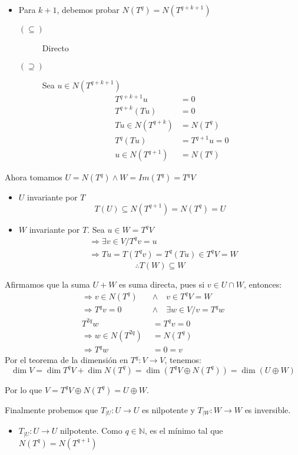 \documentclass[10pt,a4paper]{article}
\begin{document}
\begin{itemize}
\begin{itemize}
			\item Para $k+1$, debemos probar $N\left(T^{q}\right) = N\left(T^{q+k+1}\right)$
				\begin{description}
					\item[$(\subseteq)$] Directo
					\item[$(\supseteq)$] Sea $u\in N\left(T^{q+k+1}\right)$
						\begin{align*}
							T^{q+k+1}u &= 0\\
							T^{q+k}(Tu) &= 0\\
							Tu \in N(T^{q+k}) & = N(T^{q})\\
							T^{q}(Tu) & = T^{q+1} u= 0 \\
							u \in N(T^{q+1}) &= N(T^{q})
						\end{align*}
				\end{description}
		\end{itemize}
		Ahora tomamos $U = N(T^{q})\wedge W = Im(T^{q}) = T^{q}V$
		\begin{itemize}
			\item $U$ invariante por $T$
				$$T(U)\subseteq N(T^{q+1}) = N(T^{q}) = U$$
			\item $W$ invariante por $T$.
				Sea $u\in W = T^{q}V$ 
				\begin{align*}
					& \Rightarrow\exists v\in V/ T^{q}v = u\\
					& \Rightarrow Tu = T(T^{q}v) = T^{q}(Tu)\in T^{q}V = W
				\end{align*}
				$$\therefore T(W)\subseteq W$$				
		\end{itemize}
		Afirmamos que la suma $U+W$ es suma directa, pues si $v\in U\cap W$, entonces:
		\begin{align*}
			\Rightarrow v\in N(T^{q})\quad &\wedge\quad v\in T^{q}V = W\\
			\Rightarrow	T^{q}v = 0\quad &\wedge\quad\exists w\in V/ v = T^{q}w\\
			T^{2q}w & = T^{q}v = 0 \\
			\Rightarrow w\in N(T^{2q}) & = N(T^{q})\\
			\Rightarrow T^{q}w & = 0 = v 
		\end{align*}
		Por el teorema de la dimensión en $T^{q}:V\rightarrow V$, tenemos:
		$$\dim V = \dim T^{q}V  + \dim N(T^{q}) = \dim (T^{q}V\oplus N(T^{q})) = \dim (U\oplus W)$$
		
		Por lo que $V = T^{q}V \oplus N(T^{q}) = U\oplus W$.
		
		Finalmente probemos que $T_{|U}:U\rightarrow U$ es nilpotente y $T_{|W}:W\rightarrow W$ es inversible.
		\begin{itemize}
			\item $T_{|U}:U\rightarrow U$ nilpotente.
			Como $q\in\mathbb{N}$, es el mínimo tal que $ N(T^{q}) = N(T^{q+1})$
			

\end{itemize}
\end{itemize}
\end{document}
